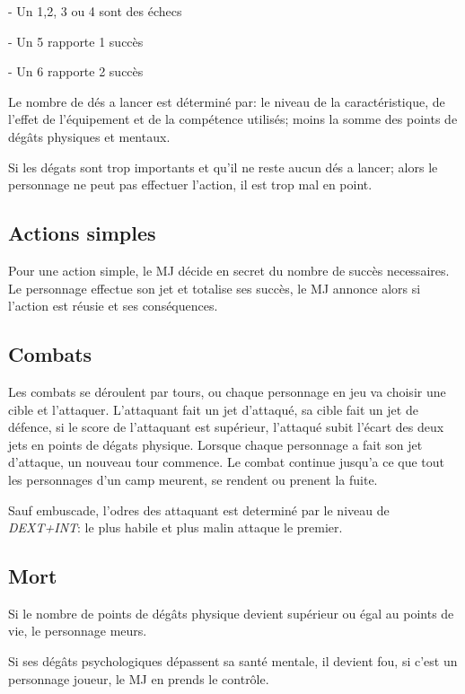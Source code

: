 \begin{landscape}
\begin{multicols}{4}
- Un 1,2, 3 ou 4 sont des échecs

- Un 5 rapporte 1 succès

- Un 6 rapporte 2 succès
	
Le nombre de dés a lancer est déterminé par: le niveau de la caractéristique, de l'effet de l’équipement et de la compétence utilisés; moins la somme des points de dégâts physiques et mentaux.

Si les dégats sont trop importants et qu'il ne reste aucun dés a lancer; alors le personnage ne peut pas effectuer l'action, il est trop mal en point.


	
\subsection{Actions simples}

Pour une action simple, le MJ décide en secret du nombre de succès necessaires.
Le personnage effectue son jet et totalise ses succès, le MJ annonce alors si l'action est réusie et ses conséquences. 
	

\subsection{Combats}

Les combats se déroulent par tours, ou chaque personnage en jeu va choisir une cible et l'attaquer.
L'attaquant fait un jet d'attaqué, sa cible fait un jet de défence, si le score de l'attaquant est supérieur, l'attaqué subit l'écart des deux jets en points de dégats physique.
Lorsque chaque personnage a fait son jet d'attaque, un nouveau tour commence.
Le combat continue jusqu'a ce que tout les personnages d'un camp meurent, se rendent ou prenent la fuite.


Sauf embuscade, l’odres des attaquant est determiné par le niveau de \textit{DEXT+INT}: le plus habile et plus malin attaque le premier.

\subsection{Mort}

Si le nombre de points de dégâts physique devient supérieur ou égal au points de vie, le personnage meurs.

Si ses dégâts psychologiques dépassent sa santé mentale, il devient fou, si c'est un personnage joueur, le MJ en prends le contrôle.

\vfill\null

\end{multicols}
\end{landscape}

